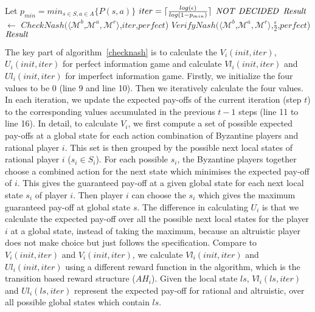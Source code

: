 \begin{algorithm}[H]
	\caption{$\mi{VerifyNash}$($\langle \mathcal{M}^b$, $\mathcal{M}^a, \mathcal{M}^r \rangle$, $\epsilon$, $\mi{iter}_{max}$, $\mi{perfect}$)}
	\label{verifynash}
	\begin{algorithmic}[1]
		\STATE Let $p_{min}= min_{s \in S, a \in A} \{P(s,a)\} $
		\STATE $iter = \lceil\frac{log(\epsilon)}{log(1-p_{min})}\rceil$
		\RETURN $\mathit{NOT}\ \mathit{DECIDED}$
		\ENDIF
		\STATE $\mathit{Result}$ $\leftarrow$ $ CheckNash(\langle \mathcal{M}^b$,$\mathcal{M}^a,\mathcal{M}^r \rangle$,$iter$,$perfect$)
		\STATE $ VerifyNash(\langle \mathcal{M}^b$,$\mathcal{M}^a,\mathcal{M}^r \rangle$,$\frac{\epsilon}{2}$,$perfect$)
		\ELSE
		\RETURN $\mathit{Result}$
		\ENDIF
	\end{algorithmic}
\end{algorithm}

The key part of algorithm~\ref{checknash} is to calculate the $V_i(init, iter)$, $U_i(init, iter)$ for perfect information game and calculate 
$Vl_i(init, iter)$ and $Ul_i(init, iter)$ for imperfect information game. Firstly, we initialize the four values to be $0$ (line 9 and line 10).
Then we iteratively calculate the four values. In each iteration, we update the expected pay-offs of the current iteration (step $t$) to the corresponding values accumulated in the previous $t-1$ steps (line 11 to line 16). 
In detail, to calculate $V_i$, we first compute a set of possible expected pay-offs at a global state for each action combination of Byzantine players and rational player $i$. This set is then grouped by the possible next local states of rational player $i$ ($s_i \in S_i$). For each possible $s_i$, the Byzantine players together choose a combined action for the next state which minimises the expected pay-off of $i$. This gives the guaranteed pay-off at a given global state for each next local state $s_i$ of player $i$. Then player $i$ can choose the $s_i$ which gives the maximum guaranteed pay-off at global state $s$. The difference in calculating $U_i$ is that we calculate the expected pay-off over all the possible next local states for the player $i$ at a global state, instead of taking the maximum, because an altruistic player does not make choice but just follows the specification. Compare to $V_i(init, iter)$ and $V_i(init, iter)$, we calculate $Vl_i(init, iter)$ and $Ul_i(init, iter)$ using a different reward function in the algorithm, which is the transition based reward structure ($AH_i$). Given the local state $ls$, $Vl_i(ls, iter)$ and $Ul_i(ls, iter)$ represent the expected pay-off for rational and altruistic, over all possible global states which contain $ls$. %

